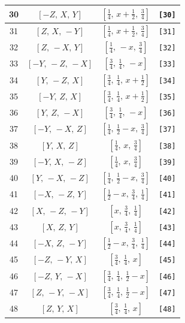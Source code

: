 \documentclass[fleqn,8pt]{jsarticle}
\begin{document}
\begin{longtable}{cccc}
30 & $\left[ - Z,\, X,\, Y \right]$ & $\left[ \frac{1}{4},\, x + \frac{1}{2},\, \frac{3}{4} \right]$ & {\tt [30]} \\ \hline
31 & $\left[ Z,\, X,\, - Y \right]$ & $\left[ \frac{1}{4},\, x + \frac{1}{2},\, \frac{3}{4} \right]$ & {\tt [31]} \\ \hline
32 & $\left[ Z,\, - X,\, Y \right]$ & $\left[ \frac{1}{4},\, - x,\, \frac{3}{4} \right]$ & {\tt [32]} \\ \hline
33 & $\left[ - Y,\, - Z,\, - X \right]$ & $\left[ \frac{3}{4},\, \frac{1}{4},\, - x \right]$ & {\tt [33]} \\ \hline
34 & $\left[ Y,\, - Z,\, X \right]$ & $\left[ \frac{3}{4},\, \frac{1}{4},\, x + \frac{1}{2} \right]$ & {\tt [34]} \\ \hline
35 & $\left[ - Y,\, Z,\, X \right]$ & $\left[ \frac{3}{4},\, \frac{1}{4},\, x + \frac{1}{2} \right]$ & {\tt [35]} \\ \hline
36 & $\left[ Y,\, Z,\, - X \right]$ & $\left[ \frac{3}{4},\, \frac{1}{4},\, - x \right]$ & {\tt [36]} \\ \hline
37 & $\left[ - Y,\, - X,\, Z \right]$ & $\left[ \frac{1}{4},\, \frac{1}{2} - x,\, \frac{3}{4} \right]$ & {\tt [37]} \\ \hline
38 & $\left[ Y,\, X,\, Z \right]$ & $\left[ \frac{1}{4},\, x,\, \frac{3}{4} \right]$ & {\tt [38]} \\ \hline
39 & $\left[ - Y,\, X,\, - Z \right]$ & $\left[ \frac{1}{4},\, x,\, \frac{3}{4} \right]$ & {\tt [39]} \\ \hline
40 & $\left[ Y,\, - X,\, - Z \right]$ & $\left[ \frac{1}{4},\, \frac{1}{2} - x,\, \frac{3}{4} \right]$ & {\tt [40]} \\ \hline
41 & $\left[ - X,\, - Z,\, Y \right]$ & $\left[ \frac{1}{2} - x,\, \frac{3}{4},\, \frac{1}{4} \right]$ & {\tt [41]} \\ \hline
42 & $\left[ X,\, - Z,\, - Y \right]$ & $\left[ x,\, \frac{3}{4},\, \frac{1}{4} \right]$ & {\tt [42]} \\ \hline
43 & $\left[ X,\, Z,\, Y \right]$ & $\left[ x,\, \frac{3}{4},\, \frac{1}{4} \right]$ & {\tt [43]} \\ \hline
44 & $\left[ - X,\, Z,\, - Y \right]$ & $\left[ \frac{1}{2} - x,\, \frac{3}{4},\, \frac{1}{4} \right]$ & {\tt [44]} \\ \hline
45 & $\left[ - Z,\, - Y,\, X \right]$ & $\left[ \frac{3}{4},\, \frac{1}{4},\, x \right]$ & {\tt [45]} \\ \hline
46 & $\left[ - Z,\, Y,\, - X \right]$ & $\left[ \frac{3}{4},\, \frac{1}{4},\, \frac{1}{2} - x \right]$ & {\tt [46]} \\ \hline
47 & $\left[ Z,\, - Y,\, - X \right]$ & $\left[ \frac{3}{4},\, \frac{1}{4},\, \frac{1}{2} - x \right]$ & {\tt [47]} \\ \hline
48 & $\left[ Z,\, Y,\, X \right]$ & $\left[ \frac{3}{4},\, \frac{1}{4},\, x \right]$ & {\tt [48]} \\
\end{longtable}
\end{document}
